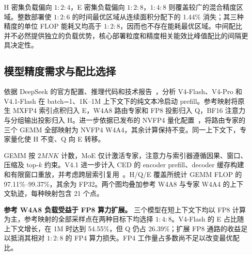\begin{table}[!t]
\centering
\caption{Optimal-region fractions with MXFP4 as E. Energy fractions are unchanged by integer core deployment.}
\label{tab:k4_regions}
\begingroup\footnotesize\setlength{\tabcolsep}{2pt}

\endgroup
\end{table}

H 密集负载偏向 $1:2:4$，E 密集负载偏向 $1:2:8$，$1:4:8$ 则覆盖较广的混合精度区域。整数部署使 $1:2:6$ 的时间最优区域从连续面积分配下的 1.44\% 消失；其三种精度的单位 FLOP 能耗又均高于 $1:2:8$，因而也不存在能耗最优区域。中间配比并不必然提供独立的负载优势，核心部署粒度和精度相关能效比峰值配比的间隔更具决定性。

\subsection{模型精度需求与配比选择}
\label{sec:k4_prefill}

依据 DeepSeek 的官方配置、推理代码和技术报告~\cite{deepseekv4,deepseekv4flashsource,deepseekv4prosource,deepseekv41source}，分析 V4-Flash、V4-Pro 和 V4.1-Flash 在 batch=1、1K--1M 上下文下的纯文本冷启动 prefill。参考映射将原生 MXFP4 索引点积归入 E，W4A8 路由专家和 FP8 投影归入 Q，BF16 注意力与分组输出投影归入 H。进一步依据已发布的 NVFP4 量化配置~\cite{nvidia2026v4flashnvfp4,nvidia2026v4pronvfp4,nvidia2026deepseeknvfp4}，将路由专家的三个 GEMM 全部映射为 NVFP4 W4A4，其余计算保持不变。同一上下文下，专家量化使 H 不变、Q 向 E 转移。

GEMM 按 $2MNK$ 计数，MoE 仅计激活专家，注意力与索引器遵循因果、窗口、压缩及 top-$k$ 约束。V4.1 进一步计入 CED 的 encoder prefill、decoder 缓存构建和有限窗口重放，并考虑跨层索引复用~\cite{deepseekv41source}。H/Q/E 覆盖所统计 GEMM FLOP 的 97.11\%--99.37\%，其余为 FP32。两个图均叠加参考 W4A8 与专家 W4A4 的上下文轨迹，每种映射包含 21 个点。

\begin{table}[!t]
\centering
\caption{Reference W4A8 prefill endpoints. H/Q/E shares are normalized over useful GEMM FLOPs. Speedup and DP energy reduction $\Delta E$ compare $1:4:8$ against $1:2:4$.}
\label{tab:k4_prefill_points}
\begingroup\footnotesize\setlength{\tabcolsep}{4pt}

\endgroup
\end{table}

\textbf{参考 W4A8 负载受益于 FP8 算力扩展。} 三个模型在短上下文下均以 FP8 计算为主，参考映射的全部采样点在两种目标下均选择 $1:4:8$。V4-Flash 的 E 占比随上下文增长，在 1M 时达到 54.55\%，但 Q 仍占 26.39\%；扩展 FP8 通路的收益足以抵消其相对 $1:2:8$ 的 FP4 算力损失。FP4 工作量占多数尚不足以改变最优配比。

